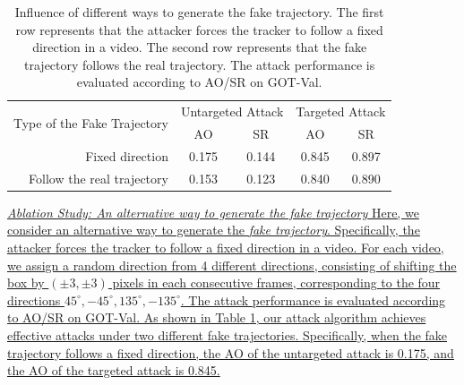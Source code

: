 \documentclass[journal]{IEEEtran}
\begin{document}
\begin{table}[t]
  \centering
  \caption{Influence of different ways to generate the fake trajectory.
  The first row represents that the attacker forces the tracker to follow a fixed direction in a video.
  The second row represents that the fake trajectory follows the real trajectory. The attack performance is evaluated according to AO/SR on GOT-Val.}
  \begin{tabular}{@{}rcccc@{}}
  \toprule
  \multirow{2}{*}[-2pt]{Type of the Fake Trajectory} & \multicolumn{2}{c}{Untargeted Attack} & \multicolumn{2}{c}{Targeted Attack} \\ \cmidrule{2-5}
                              & AO                & SR                & AO               & SR               \\ \midrule
  Fixed direction             & 0.175             & 0.144             & 0.845            & 0.897            \\
  Follow the real trajectory  & 0.153             & 0.123             & 0.840            & 0.890            \\ \bottomrule        
  \end{tabular}
  \label{table:direction}
\end{table}
\uline{\textit{Ablation Study: An alternative way to generate the fake} 
\textit{trajectory}
Here, we consider an alternative way to generate the \textit{fake trajectory}.
Specifically, the attacker forces the tracker to follow a fixed direction in a video. For each video, we assign a random direction from 4 different directions, consisting of shifting the box by $(\pm 3, \pm 3)$ pixels in each consecutive frames, corresponding to the four directions $45^{\circ}, -45^{\circ}, 135^{\circ}, -135^{\circ}$.
The attack performance is evaluated according to AO/SR on GOT-Val.
As shown in Table \ref{table:direction}, our attack algorithm achieves effective attacks under two different fake trajectories. Specifically, when the fake trajectory follows a fixed direction, the AO of the untargeted attack is 0.175, and the AO of the targeted attack is 0.845.}
\end{document}
